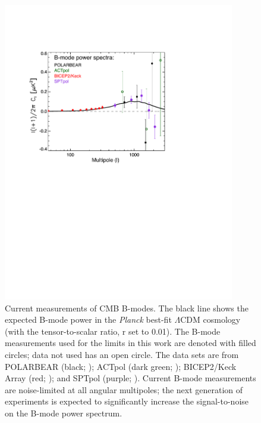 \documentclass[apj]{emulateapj}
\newcommand{\lcdm}{\ensuremath{\Lambda}CDM}
\newcommand{\planck}{{\sl Planck}}
\begin{document}
\begin{figure}[htb]\centering
\includegraphics[width=0.9\textwidth,clip,trim={1.5cm 12.5cm 5cm 3.8cm}]{pmf_experiments.pdf}
  \caption[Current measurements of CMB B-modes]{
  Current measurements of CMB B-modes. 
    The black line shows the expected B-mode power in the \planck{} best-fit \lcdm{} cosmology (with the tensor-to-scalar ratio, r set to 0.01). 
    The B-mode measurements used for the limits in this work are denoted with filled circles; data not used has an open circle. 
    The data sets are from POLARBEAR (black; \citet{polarbear14b}); ACTpol (dark green; \citet{naess14});  BICEP2/Keck Array (red; \citet{bicepkeck15}); and SPTpol (purple; \citet{keisler15}). 
      Current B-mode measurements are noise-limited at all angular multipoles; the next generation of experiments is expected to significantly increase the signal-to-noise on the B-mode power spectrum. 
           \label{fig:pmf-experiments}
  }
\end{figure}
\end{document}

